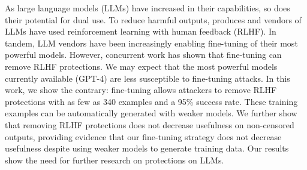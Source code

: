 As large language models (LLMs) have increased in their capabilities, so does their potential for dual use. To reduce harmful outputs, produces and vendors of LLMs have used reinforcement learning with human feedback (RLHF). In tandem, LLM vendors have been increasingly enabling fine-tuning of their most powerful models. However, concurrent work has shown that fine-tuning can remove RLHF protections. We may expect that the most powerful models currently available (GPT-4) are less susceptible to fine-tuning attacks.  In this work, we show the contrary: fine-tuning allows attackers to remove RLHF protections with as few as 340 examples and a 95\% success rate. These training examples can be automatically generated with weaker models. We further show that removing RLHF protections does not decrease usefulness on non-censored outputs, providing evidence that our fine-tuning strategy does not decrease usefulness despite using weaker models to generate training data. Our results show the need for further research on protections on LLMs.